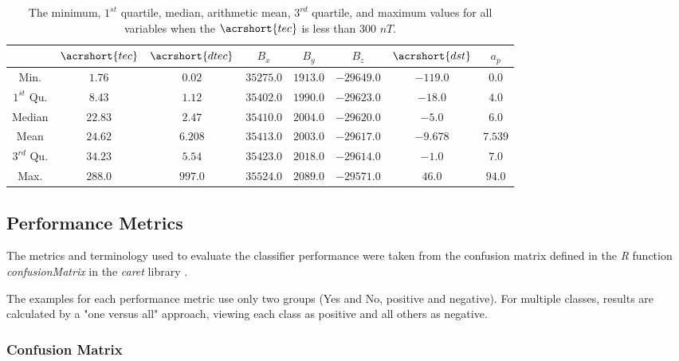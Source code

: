 \documentclass[sn-mathphys-num]{sn-jnl}%
\begin{document}
\begin{table}[!ht]
    \centering
    \caption{The minimum, $1^{st}$ quartile, median, arithmetic mean, $3^{rd}$ quartile, and maximum values for all variables when the $\acrshort{tec}$ is less than $300$ $nT$.}
    \label{tab:minmax}
        \begin{tabular}{|c|c|c|c|c|c|c|c|}
                \hline
                  & $\acrshort{tec}$ & $\acrshort{dtec}$ & $B_{x}$ & $B_{y}$ & $B_{z}$ & $\acrshort{dst}$ & $a_{p}$ \\ \hline
                Min. & $1.76$ & $0.02$ & $35275.0$ & $1913.0$ & $-29649.0$ & $-119.0$ & $0.0$ \\ \hline
                $1^{st}$ Qu. & $8.43$ & $1.12$ & $35402.0$ & $1990.0$ & $-29623.0$ & $-18.0$ & $4.0$ \\ \hline
                Median & $22.83$ & $2.47$ & $35410.0$ & $2004.0$ & $-29620.0$ & $-5.0$ & $6.0$ \\ \hline
                Mean & $24.62$ & $6.208$ & $35413.0$ & $2003.0$ & $-29617.0$ & $-9.678$ & $7.539$ \\ \hline
                $3^{rd}$ Qu. & $34.23$ & $5.54$ & $35423.0$ & $2018.0$ & $-29614.0$ & $-1.0$ & $7.0$ \\ \hline
                Max. & $288.0$ & $997.0$ & $35524.0$ & $2089.0$ & $-29571.0$ & $46.0$ & $94.0$ \\ \hline
        \end{tabular}
\end{table}

\subsection{Performance Metrics}

The metrics and terminology used to evaluate the classifier performance were taken from the confusion matrix defined in the \textit{R} function \textit{confusionMatrix} in the \textit{caret} library \cite{kuhn2008building, confusionMatrix2024}.

The examples for each performance metric use only two groups (Yes and No, positive and negative). For multiple classes, results are calculated by a "one versus all" approach, viewing each class as positive and all others as negative.

\subsubsection{Confusion Matrix}
\end{document}
